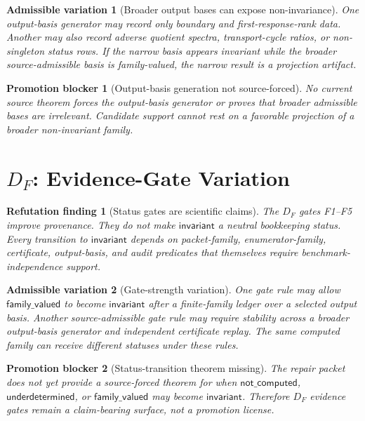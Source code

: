 \documentclass[11pt]{article}
\newtheorem{finding}{Refutation finding}
\newtheorem{variation}{Admissible variation}
\newtheorem{blocker}{Promotion blocker}
\begin{document}
\begin{variation}[Broader output bases can expose non-invariance]
One output-basis generator may record only boundary and first-response-rank
data. Another may also record adverse quotient spectra, transport-cycle
ratios, or non-singleton status rows. If the narrow basis appears invariant
while the broader source-admissible basis is family-valued, the narrow
result is a projection artifact.
\end{variation}

\begin{blocker}[Output-basis generation not source-forced]
No current source theorem forces the output-basis generator or proves that
broader admissible bases are irrelevant. Candidate support cannot rest on a
favorable projection of a broader non-invariant family.
\end{blocker}

\section{\texorpdfstring{\(D_F\)}{DF}: Evidence-Gate Variation}

\begin{finding}[Status gates are scientific claims]
The \(D_F\) gates F1--F5 improve provenance. They do not make
\(\mathsf{invariant}\) a neutral bookkeeping status. Every transition to
\(\mathsf{invariant}\) depends on packet-family, enumerator-family,
certificate, output-basis, and audit predicates that themselves require
benchmark-independence support.
\end{finding}

\begin{variation}[Gate-strength variation]
One gate rule may allow \(\mathsf{family\_valued}\) to become
\(\mathsf{invariant}\) after a finite-family ledger over a selected output
basis. Another source-admissible gate rule may require stability across a
broader output-basis generator and independent certificate replay. The same
computed family can receive different statuses under these rules.
\end{variation}

\begin{blocker}[Status-transition theorem missing]
The repair packet does not yet provide a source-forced theorem for when
\(\mathsf{not\_computed}\), \(\mathsf{underdetermined}\), or
\(\mathsf{family\_valued}\) may become \(\mathsf{invariant}\). Therefore
\(D_F\) evidence gates remain a claim-bearing surface, not a promotion
license.
\end{blocker}
\end{document}
